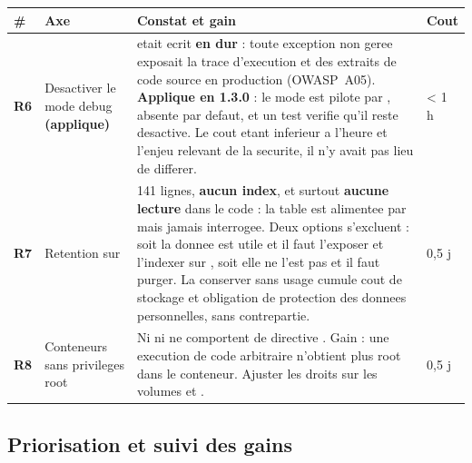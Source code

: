 \footnotesize
\begin{tabularx}{\linewidth}{@{}L{1.1cm} L{3.4cm} X L{1.3cm}@{}}
\toprule
\textbf{\#} & \textbf{Axe} & \textbf{Constat et gain} & \textbf{Cout} \\
\midrule
\textbf{R6} & Desactiver le mode debug \textcolor{VertOk}{\textbf{(applique)}} &
 etait ecrit \textbf{en dur} : toute exception non geree exposait la
trace d'execution et des extraits de code source en production (OWASP~A05). \textbf{Applique en
1.3.0} : le mode est pilote par , absente par defaut, et un test verifie qu'il
reste desactive. Le cout etant inferieur a l'heure et l'enjeu relevant de la securite, il n'y avait
pas lieu de differer. & < 1 h \\
\addlinespace
\textbf{R7} & Retention sur  &
141 lignes, \textbf{aucun index}, et surtout \textbf{aucune lecture} dans le code : la table est
alimentee par  mais jamais interrogee. Deux options s'excluent : soit la
donnee est utile et il faut l'exposer et l'indexer sur , soit elle ne l'est pas et il
faut purger. La conserver sans usage cumule cout de stockage et obligation de protection des
donnees personnelles, sans contrepartie. & 0,5 j \\
\addlinespace
\textbf{R8} & Conteneurs sans privileges root &
Ni  ni  ne comportent de directive .
Gain : une execution de code arbitraire n'obtient plus root dans le conteneur. Ajuster les droits
sur les volumes  et . & 0,5 j \\
\bottomrule
\end{tabularx}
\normalsize

\subsection{Priorisation et suivi des gains}


